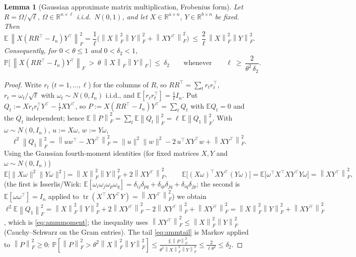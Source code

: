 \documentclass{amsart}
\newtheorem{lemma}{Lemma}
\theoremstyle{definition}
\DeclareMathOperator{\tr}{tr}
\newcommand{\R}{\mathbb{R}}
\newcommand{\Frob}[1]{\left\lVert #1\right\rVert_F}
\newcommand{\E}{\mathbb{E}}
\newcommand{\Prob}{\mathbb{P}}
\begin{document}
\begin{lemma}[Gaussian approximate matrix multiplication, Frobenius form]\label{lem:amm}
Let $R=\Omega/\sqrt\ell$, $\Omega\in\R^{n\times\ell}$ i.i.d.\ $N(0,1)$, and let
$X\in\R^{a\times n}$, $Y\in\R^{b\times n}$ be fixed. Then
\begin{equation}\label{eq:ammmoment}
\E\,\Frob{X(RR^\top-I_n)Y^\top}^2=\frac1\ell\Big(\Frob{X}^2\Frob{Y}^2+\Frob{XY^\top}^2\Big)
\ \le\ \frac2\ell\,\Frob{X}^2\Frob{Y}^2 .
\end{equation}
Consequently, for $0<\theta\le1$ and $0<\delta_2<1$,
\begin{equation}\label{eq:ammtail}
\Prob\Big[\,\Frob{X(RR^\top-I_n)Y^\top}\ >\ \theta\,\Frob{X}\Frob{Y}\,\Big]\ \le\ \delta_2
\qquad\text{whenever}\qquad \ell\ \ge\ \frac{2}{\theta^2\,\delta_2}.
\end{equation}
\end{lemma}
\begin{proof}
Write $r_t$ ($t=1,\dots,\ell$) for the columns of $R$, so
$RR^\top=\sum_t r_tr_t^\top$, $r_t=\omega_t/\sqrt\ell$ with
$\omega_t\sim N(0,I_n)$ i.i.d., and $\E[r_tr_t^\top]=\frac1\ell I_n$. Put
$Q_t:=Xr_tr_t^\top Y^\top-\tfrac1\ell XY^\top$, so
$P:=X(RR^\top-I_n)Y^\top=\sum_tQ_t$ with $\E Q_t=0$ and the $Q_t$ independent;
hence $\E\Frob P^2=\sum_t\E\Frob{Q_t}^2=\ell\,\E\Frob{Q_1}^2$. With
$\omega\sim N(0,I_n)$, $u:=X\omega$, $w:=Y\omega$,
\[
\ell^2\Frob{Q_1}^2=\Frob{uw^\top-XY^\top}^2
=\|u\|^2\|w\|^2-2\,u^\top XY^\top w+\Frob{XY^\top}^2 .
\]
Using the Gaussian fourth-moment identities (for fixed matrices $X,Y$ and
$\omega\sim N(0,I_n)$)
\[
\E\big[\|X\omega\|^2\|Y\omega\|^2\big]=\Frob X^2\Frob Y^2+2\Frob{XY^\top}^2,\qquad
\E\big[(X\omega)^\top XY^\top(Y\omega)\big]=\E\big[\omega^\top X^\top XY^\top Y\omega\big]=\Frob{XY^\top}^2 ,
\]
(the first is Isserlis/Wick: $\E[\omega_i\omega_j\omega_p\omega_q]=
\delta_{ij}\delta_{pq}+\delta_{ip}\delta_{jq}+\delta_{iq}\delta_{jp}$; the second
is $\E[\omega\omega^\top]=I_n$ applied to $\tr(X^\top XY^\top Y)=\Frob{XY^\top}^2$)
we obtain
$\ell^2\E\Frob{Q_1}^2=\Frob X^2\Frob Y^2+2\Frob{XY^\top}^2-2\Frob{XY^\top}^2+\Frob{XY^\top}^2
=\Frob X^2\Frob Y^2+\Frob{XY^\top}^2$, which is \eqref{eq:ammmoment}; the
inequality uses $\Frob{XY^\top}^2\le\Frob X^2\Frob Y^2$ (Cauchy--Schwarz on the
Gram entries). The tail \eqref{eq:ammtail} is Markov applied to
$\Frob P^2\ge0$:
$\Prob[\Frob P^2>\theta^2\Frob X^2\Frob Y^2]\le
\frac{\E\Frob P^2}{\theta^2\Frob X^2\Frob Y^2}\le\frac{2}{\ell\theta^2}\le\delta_2$.
\end{proof}
\end{document}
